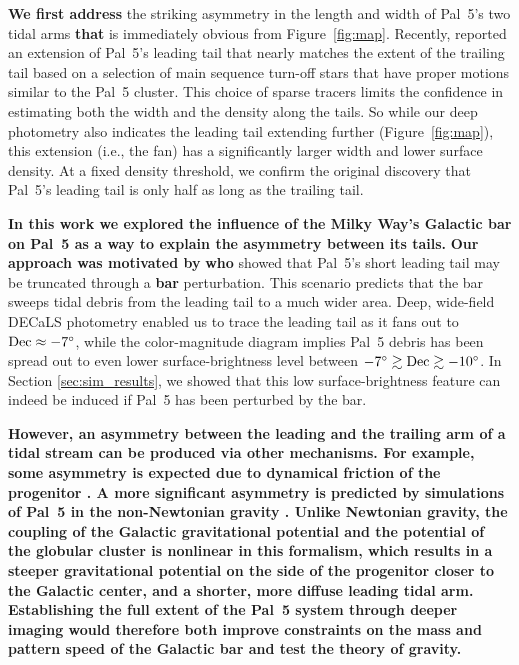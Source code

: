 \documentclass[twocolumn]{aastex62}
\newcommand{\changes}[1]{{\textbf{#1}}}
\begin{document}
\changes{We first address} the striking asymmetry in the length and width of Pal~5's two tidal arms \changes{that} is immediately obvious from Figure~\ref{fig:map}.
Recently, \citet{Starkman:2019} reported an extension of Pal~5's leading tail that nearly matches the extent of the trailing tail based on a selection of main sequence turn-off stars that have proper motions similar to the Pal~5 cluster.
This choice of sparse tracers limits the confidence in estimating both the width and the density along the tails.
So while our deep photometry also indicates the leading tail extending further (Figure~\ref{fig:map}), this extension (i.e., the fan) has a significantly larger width and lower surface density.
At a fixed density threshold, we confirm the original \citet{Bernard:2016} discovery that Pal~5's leading tail is only half as long as the trailing tail.

\changes{In this work we explored the influence of the Milky Way's Galactic bar on Pal~5 as a way to explain the asymmetry between its tails.}
\changes{Our approach was motivated by} \citet{Pearson:2017} \changes{who} showed that Pal~5's short leading tail may be truncated through a \changes{bar} perturbation.
This scenario predicts that the bar sweeps tidal debris from the leading tail to a much wider area.
Deep, wide-field DECaLS photometry enabled us to trace the leading tail as it fans out to $\rm Dec\approx-7^\circ$, while the color-magnitude diagram implies Pal~5 debris has been spread out to even lower surface-brightness level between $-7^\circ\gtrsim\rm Dec\gtrsim-10^\circ$.
In Section \ref{sec:sim_results}, we showed that this low surface-brightness feature can indeed be induced if Pal~5 has been perturbed by the bar.

\changes{
However, an asymmetry between the leading and the trailing arm of a tidal stream can be produced via other mechanisms.
For example, some asymmetry is expected due to dynamical friction of the progenitor \citep[although only $0.02^\circ$ for Pal~5,][]{Kipper:2019}.
A more significant asymmetry is predicted by simulations of Pal~5 in the non-Newtonian gravity \citep{Thomas:2018}.
Unlike Newtonian gravity, the coupling of the Galactic gravitational potential and the potential of the globular cluster is nonlinear in this formalism, which results in a steeper gravitational potential on the side of the progenitor closer to the Galactic center, and a shorter, more diffuse leading tidal arm.
Establishing the full extent of the Pal~5 system through deeper imaging would therefore both improve constraints on the mass and pattern speed of the Galactic bar \citep[e.g.,][]{Clarke:2019, Sanders:2019, Bovy:2019} and test the theory of gravity.
}
\end{document}
